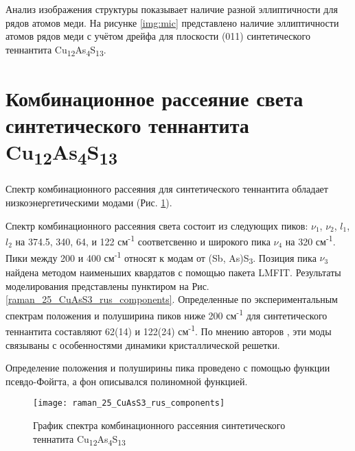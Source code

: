 Анализ изображения структуры показывает наличие разной эллиптичности для рядов атомов меди. На рисунке \ref{img:mic} представлено наличие эллиптичности атомов рядов меди с учётом дрейфа для плоскости (011) синтетического теннантита Cu\textsubscript{12}As\textsubscript{4}S\textsubscript{13}.




\newpage



\section{Комбинационное рассеяние света синтетического теннантита Cu\textsubscript{12}As\textsubscript{4}S\textsubscript{13}} \label{sect3_3}

Спектр комбинационного рассеяния для синтетического теннантита обладает низкоэнергетическими модами (Рис. \ref{img:raman1a}).

Спектр комбинационного рассеяния света состоит из следующих пиков: $\nu_{1}$, $\nu_{2}$, $l_{1}$, $l_{2}$ на 374.5, 340, 64, и 122 см\textsuperscript{-1} соответсвенно и широкого пика $\nu_{4}$ на 320 см\textsuperscript{-1}. Пики между 200 и 400 см\textsuperscript{-1} относят к модам от (Sb, As)S\textsubscript{3}\cite{Kharbish2007}. Позиция пика $\nu_{3}$ найдена методом наименьших квардатов с помощью пакета LMFIT.
Результаты моделирования представлены пунктиром на Рис. \ref{raman_25_CuAsS3_rus_components}. 
Определенные по экспериментальным спектрам положения и полуширина пиков ниже 200 см\textsuperscript{-1} для синтетического теннантита составляют 62(14) и 122(24) см\textsuperscript{-1}.  По мнению авторов \cite{Buzatu2017}, эти моды связываны с особенностями динамики кристаллической решетки.

Определение положения  и  полуширины пика проведено с помощью функции псевдо-Фойгта, а фон описывался полиномной функцией.

\begin{figure}[h]
    \texttt{[image: raman\_25\_CuAsS3\_rus\_components]}

      \caption[График спектра комбинационного рассеяния синтетического теннатита Cu\textsubscript{12}As\textsubscript{4}S\textsubscript{13}]{График спектра комбинационного рассеяния синтетического теннатита Cu\textsubscript{12}As\textsubscript{4}S\textsubscript{13}}

    \label{img:raman1a}
\end{figure}

\newpage


